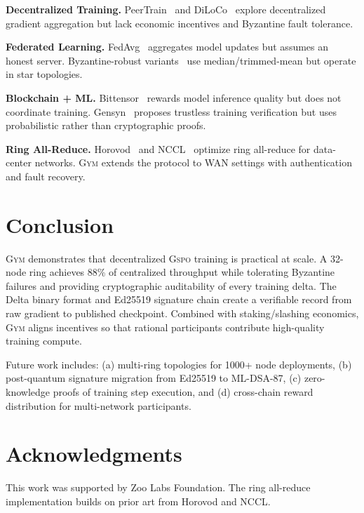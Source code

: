 \documentclass[11pt,letterpaper]{article}
\newcommand{\GYM}{\textsc{Gym}}
\newcommand{\GSPO}{\textsc{Gspo}}
\begin{document}
\textbf{Decentralized Training.} PeerTrain~\cite{tang2018communication} and DiLoCo~\cite{douillard2023diloco} explore decentralized gradient aggregation but lack economic incentives and Byzantine fault tolerance.

\textbf{Federated Learning.} FedAvg~\cite{mcmahan2017communication} aggregates model updates but assumes an honest server.  Byzantine-robust variants~\cite{blanchard2017machine,yin2018byzantine} use median/trimmed-mean but operate in star topologies.

\textbf{Blockchain + ML.} Bittensor~\cite{bittensor2023} rewards model inference quality but does not coordinate training.  Gensyn~\cite{gensyn2023} proposes trustless training verification but uses probabilistic rather than cryptographic proofs.

\textbf{Ring All-Reduce.} Horovod~\cite{sergeev2018horovod} and NCCL~\cite{nccl2024} optimize ring all-reduce for data-center networks.  \GYM{} extends the protocol to WAN settings with authentication and fault recovery.

\section{Conclusion}
\label{sec:conclusion}

\GYM{} demonstrates that decentralized \GSPO{} training is practical at scale.  A 32-node ring achieves 88\% of centralized throughput while tolerating Byzantine failures and providing cryptographic auditability of every training delta.  The Delta binary format and Ed25519 signature chain create a verifiable record from raw gradient to published checkpoint.  Combined with staking/slashing economics, \GYM{} aligns incentives so that rational participants contribute high-quality training compute.

Future work includes: (a) multi-ring topologies for 1000+ node deployments, (b) post-quantum signature migration from Ed25519 to ML-DSA-87, (c) zero-knowledge proofs of training step execution, and (d) cross-chain reward distribution for multi-network participants.

\section*{Acknowledgments}

This work was supported by Zoo Labs Foundation.  The ring all-reduce implementation builds on prior art from Horovod and NCCL.
\end{document}
